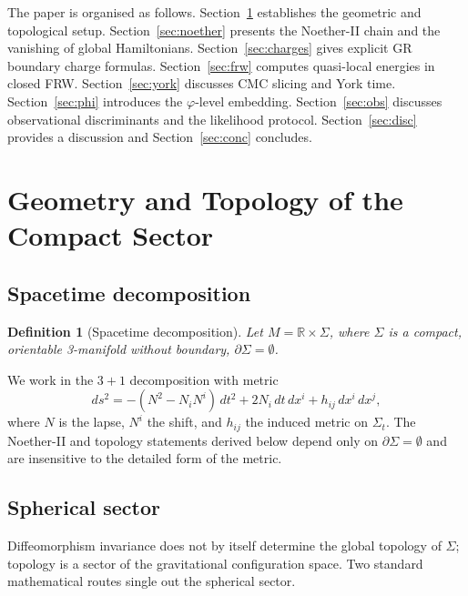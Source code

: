 \documentclass[12pt,a4paper]{article}
\newtheorem{definition}{Definition}[section]
\newcommand{\Sig}{\Sigma}           %
\newcommand{\pa}{\partial}          %
\begin{document}
The paper is organised as follows. Section~\ref{sec:geom}
establishes the geometric and topological setup.
Section~\ref{sec:noether} presents the Noether-II chain
and the vanishing of global Hamiltonians. Section~\ref{sec:charges}
gives explicit GR boundary charge formulas.
Section~\ref{sec:frw} computes quasi-local energies in
closed FRW. Section~\ref{sec:york} discusses CMC slicing
and York time. Section~\ref{sec:phi} introduces the
$\varphi$-level embedding. Section~\ref{sec:obs} discusses
observational discriminants and the likelihood protocol.
Section~\ref{sec:disc} provides a discussion and
Section~\ref{sec:conc} concludes.

\section{Geometry and Topology of the Compact Sector}
\label{sec:geom}

\subsection{Spacetime decomposition}

\begin{definition}[Spacetime decomposition]
Let $M = \mathbb{R}\times\Sig$, where $\Sig$ is a compact,
orientable 3-manifold without boundary, $\pa\Sig = \emptyset$.
\end{definition}

We work in the $3{+}1$ decomposition with metric
\begin{equation}
  ds^2 = -(N^2 - N_i N^i)\,dt^2 + 2N_i\,dt\,dx^i + h_{ij}\,dx^i\,dx^j,
\end{equation}
where $N$ is the lapse, $N^i$ the shift, and $h_{ij}$ the
induced metric on $\Sig_t$. The Noether-II and topology
statements derived below depend only on $\pa\Sig = \emptyset$
and are insensitive to the detailed form of the metric.

\subsection{Spherical sector}

Diffeomorphism invariance does not by itself determine the
global topology of $\Sig$; topology is a sector of the
gravitational configuration space. Two standard mathematical
routes single out the spherical sector.
\end{document}
